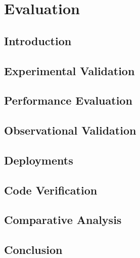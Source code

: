 \chapter{Evaluation}

\section{Introduction}

\section{Experimental Validation}

\section{Performance Evaluation}

\section{Observational Validation}

\section{Deployments}

\section{Code Verification}

\section{Comparative Analysis}

\section{Conclusion}
